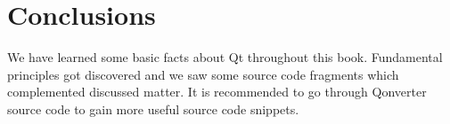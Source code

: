 \chapter{Conclusions}
We have learned some basic facts about Qt throughout this book. Fundamental principles got discovered and we saw some source code fragments which complemented discussed matter. It is recommended to go through Qonverter source code to gain more useful source code \citep{various:qonrepo} snippets.